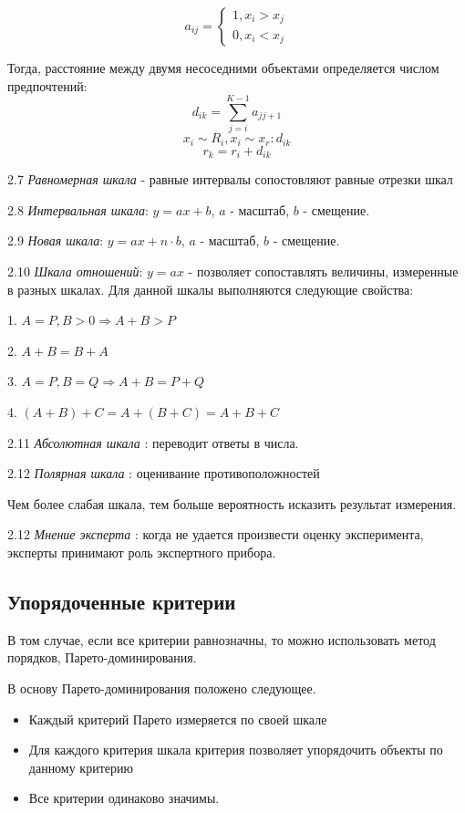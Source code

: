 \documentclass[aps,%
12pt,%
final,%
oneside,
onecolumn,%
musixtex, %
superscriptaddress,%
centertags]{article} %
\begin{document}
$$a_{ij} = 
\left\{
\begin{matrix}
1, x_i > x_j \\
0, x_i < x_j
\end{matrix} \right.
$$

Тогда, расстояние между двумя несоседними объектами определяется числом предпочтений:
$$ d_{ik} = \sum_{j=i}^{K-1} a_{jj+1} $$
$$ x_i \sim R_i , x_i \sim x_r: d_{ik} $$
$$ r_k = r_i +d_{ik} $$

2.7 \textit{Равномерная шкала} - равные интервалы сопостовляют равные отрезки шкал

2.8 \textit{Интервальная шкала}: $y = ax+b$, $a$ - масштаб, $b$ - смещение.

2.9 \textit{Новая шкала}: $y = ax+n\cdot b$, $a$ - масштаб, $b$ - смещение.

2.10 \textit{Шкала отношений}: $y = ax$ - позволяет сопоставлять величины, измеренные в разных шкалах. Для данной шкалы выполняются следующие свойства:

\begin{center}
1. $ A=P,B>0 \Rightarrow A + B > P $

2. $ A + B = B + A $

3. $ A = P, B = Q \Rightarrow A + B = P + Q $

4. $(A + B ) + C = A + (B + C) = A + B + C$
\end{center}

2.11 \textit{Абсолютная шкала }: переводит ответы в числа.

2.12 \textit{Полярная шкала }: оценивание противоположностей

Чем более слабая шкала, тем больше вероятность исказить результат измерения.

2.12 \textit{Мнение эксперта }: когда не удается произвести оценку эксперимента, эксперты принимают роль экспертного прибора.

\subsection{Упорядоченные критерии}

В том случае, если все критерии равнозначны, то можно использовать метод порядков, Парето-доминирования.

В основу Парето-доминирования положено следующее. 
\begin{itemize}
	\item Каждый критерий Парето измеряется по своей шкале
	\item Для каждого критерия шкала критерия позволяет упорядочить объекты по данному критерию
	\item Все критерии одинаково значимы.
\end{itemize}
\end{document}
